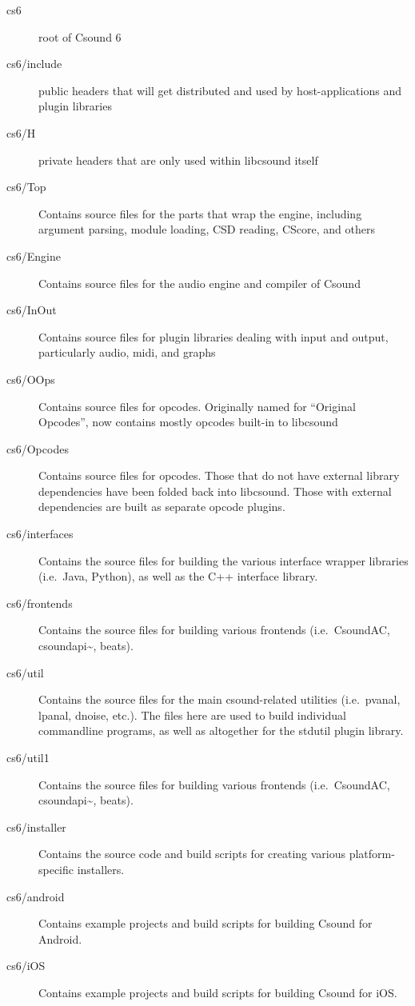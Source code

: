 \documentclass[]{book}
\begin{document}
\begin{description}

\item[cs6] root of Csound 6

\item[cs6/include] public headers that will get distributed and used by host-applications
and plugin libraries

\item[cs6/H] private headers that are only used within libcsound itself

\item[cs6/Top] Contains source files for the parts that wrap the engine, including
argument parsing, module loading, CSD reading, CScore, and others

\item[cs6/Engine] Contains source files for the audio engine and compiler of Csound

\item[cs6/InOut] Contains source files for plugin libraries dealing with input and
output, particularly audio, midi, and graphs

\item[cs6/OOps] Contains source files for opcodes. Originally named for ``Original
Opcodes'', now contains mostly opcodes built-in to libcsound

\item[cs6/Opcodes] Contains source files for opcodes. Those that do not have external
library dependencies have been folded back into libcsound. Those with
external dependencies are built as separate opcode plugins.

\item[cs6/interfaces] Contains the source files for building the various interface wrapper
libraries (i.e.~Java, Python), as well as the C++ interface library.

\item[cs6/frontends] Contains the source files for building various frontends (i.e.~CsoundAC,
csoundapi\textasciitilde{}, beats).

\item[cs6/util] Contains the source files for the main csound-related utilities
(i.e.~pvanal, lpanal, dnoise, etc.). The files here are used to build
individual commandline programs, as well as altogether for the stdutil
plugin library.

\item[cs6/util1] Contains the source files for building various frontends (i.e.~CsoundAC,
csoundapi\textasciitilde{}, beats).

\item[cs6/installer] Contains the source code and build scripts for creating various
platform-specific installers.

\item[cs6/android] Contains example projects and build scripts for building Csound for
Android.

\item[cs6/iOS] Contains example projects and build scripts for building Csound for iOS.

\end{description}
\end{document}
